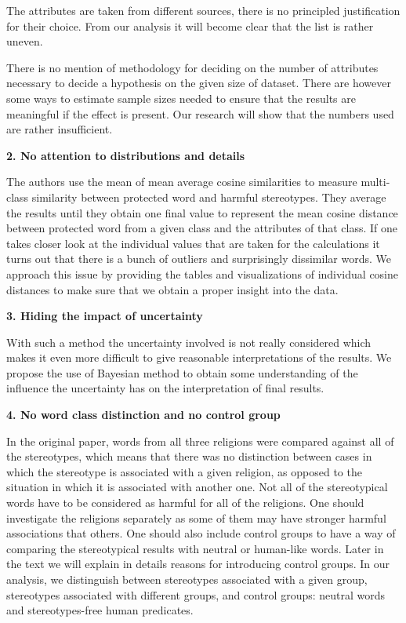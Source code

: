 \documentclass[10pt,dvipsnames,enabledeprecatedfontcommands]{scrartcl}
\begin{document}
The attributes are taken from different sources, there is no principled
justification for their choice. From our analysis it will become clear
that the list is rather uneven.

There is no mention of methodology for deciding on the number of
attributes necessary to decide a hypothesis on the given size of
dataset. There are however some ways to estimate sample sizes needed to
ensure that the results are meaningful if the effect is present. Our
research will show that the numbers used are rather insufficient.

\textbf{2. No attention to distributions and details}

The authors use the mean of mean average cosine similarities to measure
multi-class similarity between protected word and harmful stereotypes.
They average the results until they obtain one final value to represent
the mean cosine distance between protected word from a given class and
the attributes of that class. If one takes closer look at the individual
values that are taken for the calculations it turns out that there is a
bunch of outliers and surprisingly dissimilar words. We approach this
issue by providing the tables and visualizations of individual cosine
distances to make sure that we obtain a proper insight into the data.

\textbf{3. Hiding the impact of uncertainty}

With such a method the uncertainty involved is not really considered
which makes it even more difficult to give reasonable interpretations of
the results. We propose the use of Bayesian method to obtain some
understanding of the influence the uncertainty has on the interpretation
of final results.

\textbf{4. No word class distinction and no control group}

In the original paper, words from all three religions were compared
against all of the stereotypes, which means that there was no
distinction between cases in which the stereotype is associated with a
given religion, as opposed to the situation in which it is associated
with another one. Not all of the stereotypical words have to be
considered as harmful for all of the religions. One should investigate
the religions separately as some of them may have stronger harmful
associations that others. One should also include control groups to have
a way of comparing the stereotypical results with neutral or human-like
words. Later in the text we will explain in details reasons for
introducing control groups. In our analysis, we distinguish between
stereotypes associated with a given group, stereotypes associated with
different groups, and control groups: neutral words and stereotypes-free
human predicates.
\end{document}
